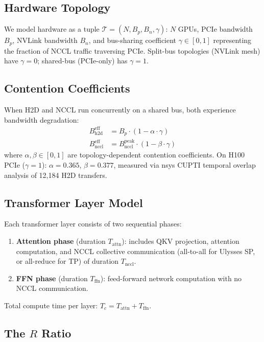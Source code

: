 \documentclass{article}
\begin{document}
\subsection{Hardware Topology}

We model hardware as a tuple $\mathcal{T} = (N, B_p, B_n, \gamma)$: $N$ GPUs, PCIe bandwidth $B_p$, NVLink bandwidth $B_n$, and bus-sharing coefficient $\gamma \in [0,1]$ representing the fraction of NCCL traffic traversing PCIe. Split-bus topologies (NVLink mesh) have $\gamma = 0$; shared-bus (PCIe-only) has $\gamma = 1$.

\subsection{Contention Coefficients}

When H2D and NCCL run concurrently on a shared bus, both experience bandwidth degradation:
\begin{align}
    B_{\text{h2d}}^{\text{eff}} &= B_p \cdot (1 - \alpha \cdot \gamma) \label{eq:bw-h2d} \\
    B_{\text{nccl}}^{\text{eff}} &= B_{\text{nccl}}^{\text{peak}} \cdot (1 - \beta \cdot \gamma) \label{eq:bw-nccl}
\end{align}
where $\alpha, \beta \in [0,1]$ are topology-dependent contention coefficients. On H100 PCIe ($\gamma=1$): $\alpha = 0.365$, $\beta = 0.377$, measured via nsys CUPTI temporal overlap analysis of 12{,}184 H2D transfers.

\subsection{Transformer Layer Model}

Each transformer layer consists of two sequential phases:
\begin{enumerate}
    \item \textbf{Attention phase} (duration $T_{\text{attn}}$): includes QKV projection, attention computation, and NCCL collective communication (all-to-all for Ulysses SP, or all-reduce for TP) of duration $T_{\text{nccl}}$.
    \item \textbf{FFN phase} (duration $T_{\text{ffn}}$): feed-forward network computation with no NCCL communication.
\end{enumerate}
Total compute time per layer: $T_c = T_{\text{attn}} + T_{\text{ffn}}$.

\subsection{The $R$ Ratio}
\end{document}
